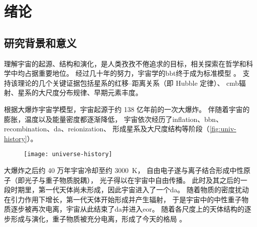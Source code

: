 
\chapter{绪论}
\label{chap:introduction}

\section{研究背景和意义}

理解宇宙的起源、结构和演化，是人类孜孜不倦追求的目标，相关探索在哲学和科学中均占据重要地位。
经过几十年的努力，宇宙学的\ac{bbt}终于成为标准模型
\cite{weinberg1972,weinberg2008,peebles1993,peacock1999}。
支持该理论的几个关键证据包括星系的红移--距离关系（即 Hubble 定律）、
\ac{cmb}辐射、星系的大尺度分布规律、早期元素丰度。

根据大爆炸宇宙学模型，宇宙起源于约 138 亿年前的一次大爆炸。
伴随着宇宙的膨胀，温度以及能量密度都逐渐降低，
宇宙依次经历了\ac{inflation}、\ac{bbn}、
\ac{recombination}、\ac{da}、\ac{reionization}、
形成星系及大尺度结构等阶段（\autoref{fig:univ-history}）。

\begin{figure}[htp]
  \centering
  \texttt{[image: universe-history]}
  \label{fig:univ-history}
\end{figure}

大爆炸之后约 40 万年宇宙冷却至约 \SI{3000}{\kelvin}，
自由电子遂与离子结合形成中性原子（即光子与重子物质脱耦），
光子得以在宇宙中自由传播。
此时及其之后的一段时期里，第一代天体尚未形成，因此宇宙进入了一个\ac{da}。
随着物质的密度扰动在引力作用下增长，第一代天体开始形成并产生辐射，
于是宇宙中的中性重子物质逐步被再次电离，宇宙从此结束了\ac{da}并进入\ac{eor}。
随着各尺度上的天体结构的逐步形成与演化，重子物质被充分电离，形成了今天的格局
\cite{peebles1980,peebles1993,peacock1999}。

